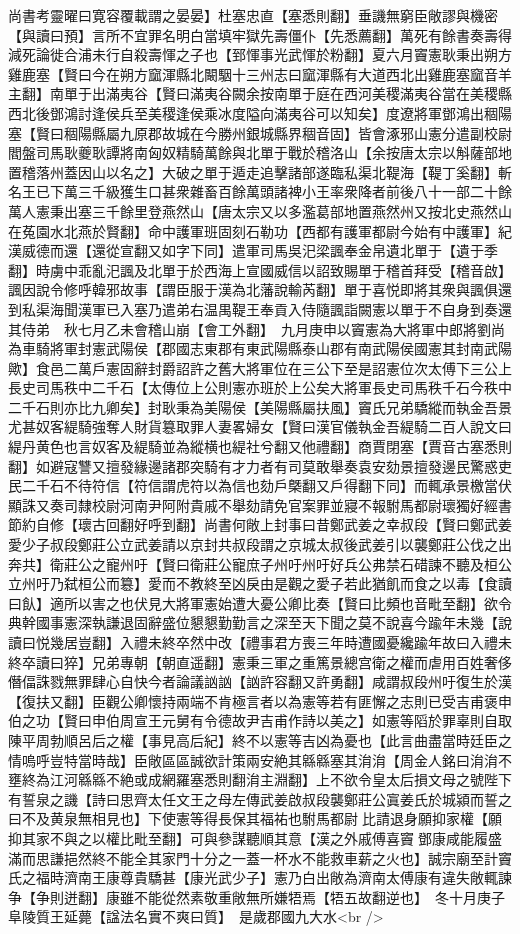 尚書考靈曜曰寛容覆載謂之晏晏】杜塞忠直【塞悉則翻】垂譏無窮臣敞謬與機密【與讀曰預】言所不宜罪名明白當填牢獄先壽僵仆【先悉薦翻】萬死有餘書奏壽得減死論徙合浦未行自殺壽惲之子也【郅惲事光武惲於粉翻】夏六月竇憲耿秉出朔方雞鹿塞【賢曰今在朔方窳渾縣北闞駰十三州志曰窳渾縣有大道西北出雞鹿塞窳音羊主翻】南單于出滿夷谷【賢曰滿夷谷闕余按南單于庭在西河美稷滿夷谷當在美稷縣西北後鄧鴻討逢侯兵至美稷逢侯乘冰度隘向滿夷谷可以知矣】度遼將軍鄧鴻出稒陽塞【賢曰稒陽縣屬九原郡故城在今勝州銀城縣界稒音固】皆會涿邪山憲分遣副校尉閻盤司馬耿夔耿譚將南匈奴精騎萬餘與北單于戰於稽洛山【余按唐太宗以斛薩部地置稽落州蓋因山以名之】大破之單于遁走追擊諸部遂臨私渠北鞮海【鞮丁奚翻】斬名王已下萬三千級獲生口甚衆雜畜百餘萬頭諸裨小王率衆降者前後八十一部二十餘萬人憲秉出塞三千餘里登燕然山【唐太宗又以多濫葛部地置燕然州又按北史燕然山在菟園水北燕於賢翻】命中護軍班固刻石勒功【西都有護軍都尉今始有中護軍】紀漢威德而還【還從宣翻又如字下同】遣軍司馬吳汜梁諷奉金帛遺北單于【遺于季翻】時虜中乖亂汜諷及北單于於西海上宣國威信以詔致賜單于稽首拜受【稽音啟】諷因說令修呼韓邪故事【謂臣服于漢為北藩說輸芮翻】單于喜悦即將其衆與諷俱還到私渠海聞漢軍已入塞乃遣弟右温禺鞮王奉貢入侍隨諷詣闕憲以單于不自身到奏還其侍弟　秋七月乙未會稽山崩【會工外翻】　九月庚申以竇憲為大將軍中郎將劉尚為車騎將軍封憲武陽侯【郡國志東郡有東武陽縣泰山郡有南武陽侯國憲其封南武陽歟】食邑二萬戶憲固辭封爵詔許之舊大將軍位在三公下至是詔憲位次太傅下三公上長史司馬秩中二千石【太傳位上公則憲亦班於上公矣大將軍長史司馬秩千石今秩中二千石則亦比九卿矣】封耿秉為美陽侯【美陽縣屬扶風】竇氏兄弟驕縱而執金吾景尤甚奴客緹騎強奪人財貨簒取罪人妻畧婦女【賢曰漢官儀執金吾緹騎二百人說文曰緹丹黄色也言奴客及緹騎並為縱横也緹社兮翻又他禮翻】商賈閉塞【賈音古塞悉則翻】如避寇讐又擅發緣邊諸郡突騎有才力者有司莫敢舉奏袁安劾景擅發邊民驚惑吏民二千石不待符信【符信謂虎符以為信也劾戶槩翻又戶得翻下同】而輒承景檄當伏顯誅又奏司隸校尉河南尹阿附貴戚不舉劾請免官案罪並寢不報駙馬都尉瓌獨好經書節約自修【瓌古回翻好呼到翻】尚書何敞上封事曰昔鄭武姜之幸叔段【賢曰鄭武姜愛少子叔段鄭莊公立武姜請以京封共叔段謂之京城太叔後武姜引以襲鄭莊公伐之出奔共】衛莊公之寵州吁【賢曰衛莊公寵庶子州吁州吁好兵公弗禁石碏諫不聽及桓公立州吁乃弑桓公而簒】愛而不教終至凶戾由是觀之愛子若此猶飢而食之以毒【食讀曰飤】適所以害之也伏見大將軍憲始遭大憂公卿比奏【賢曰比頻也音毗至翻】欲令典幹國事憲深執謙退固辭盛位懇懇勤勤言之深至天下聞之莫不說喜今踰年未幾【說讀曰悦幾居豈翻】入禮未終卒然中改【禮事君方喪三年時遭國憂纔踰年故曰入禮未終卒讀曰猝】兄弟專朝【朝直遥翻】憲秉三軍之重篤景總宫衛之權而虐用百姓奢侈僭偪誅戮無罪肆心自快今者論議訩訩【訩許容翻又許勇翻】咸謂叔段州吁復生於漢【復扶又翻】臣觀公卿懷持兩端不肯極言者以為憲等若有匪懈之志則已受吉甫褒申伯之功【賢曰申伯周宣王元舅有令德故尹吉甫作詩以美之】如憲等䧟於罪辜則自取陳平周勃順呂后之權【事見高后紀】終不以憲等吉凶為憂也【此言曲盡當時廷臣之情嗚呼豈特當時哉】臣敞區區誠欲計策兩安絶其緜緜塞其㳙㳙【周金人銘曰㳙㳙不壅終為江河緜緜不絶或成網羅塞悉則翻㳙主淵翻】上不欲令皇太后損文母之號陛下有誓泉之譏【詩曰思齊太任文王之母左傳武姜啟叔段襲鄭莊公寘姜氏於城潁而誓之曰不及黄泉無相見也】下使憲等得長保其福祐也駙馬都尉比請退身願抑家權【願抑其家不與之以權比毗至翻】可與參謀聽順其意【漢之外戚傅喜竇鄧康咸能履盛滿而思謙挹然終不能全其家門十分之一蓋一杯水不能救車薪之火也】誠宗廟至計竇氏之福時濟南王康尊貴驕甚【康光武少子】憲乃白出敞為濟南太傅康有違失敞輒諫争【争則迸翻】康雖不能從然素敬重敞無所嫌牾焉【牾五故翻逆也】　冬十月庚子阜陵質王延薨【諡法名實不爽曰質】　是歲郡國九大水<br />
